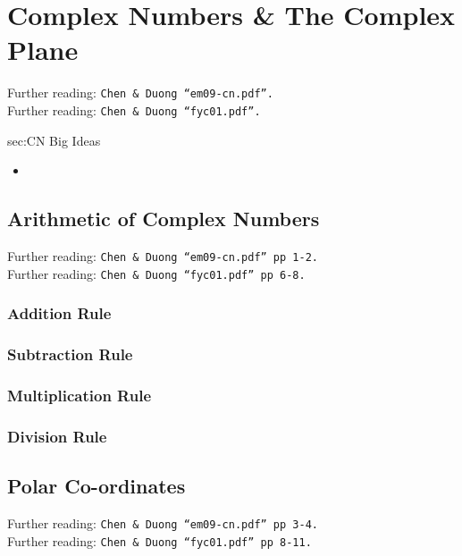 \chapter{Complex Numbers \& The Complex Plane}
\label{chap:CN}
Further reading: \texttt{Chen \& Duong ``em09-cn.pdf''.} \\
Further reading: \texttt{Chen \& Duong ``fyc01.pdf''.}

\begin{bigideas}{sec:CN Big Ideas}
\begin{itemize}
  \item 
\end{itemize}
\end{bigideas}

\section{Arithmetic of Complex Numbers}
\label{sec:CN Arithmetic of Complex Numbers}
Further reading: \texttt{Chen \& Duong ``em09-cn.pdf'' pp 1-2.} \\
Further reading: \texttt{Chen \& Duong ``fyc01.pdf'' pp 6-8.}

\subsection{Addition Rule}
\label{subsec:CN Arithmetic of Complex Numbers - Addition}

\subsection{Subtraction Rule}
\label{subsec:CN Arithmetic of Complex Numbers - Subtraction}

\subsection{Multiplication Rule}
\label{subsec:CN Arithmetic of Complex Numbers - Multiplication}

\subsection{Division Rule}
\label{subsec:CN Arithmetic of Complex Numbers - Division}

\section{Polar Co-ordinates}
\label{sec:CN Polar Co-ordinates}
Further reading: \texttt{Chen \& Duong ``em09-cn.pdf'' pp 3-4.} \\
Further reading: \texttt{Chen \& Duong ``fyc01.pdf'' pp 8-11.}